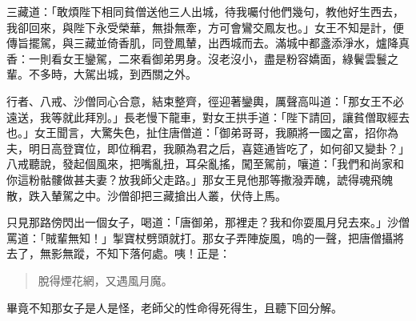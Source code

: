 三藏道：「敢煩陛下相同貧僧送他三人出城，待我囑付他們幾句，教他好生西去，我卻回來，與陛下永受榮華，無掛無牽，方可會鸞交鳳友也。」女王不知是計，便傳旨擺駕，與三藏並倚香肌，同登鳳輦，出西城而去。滿城中都盞添淨水，爐降真香：一則看女王鑾駕，二來看御弟男身。沒老沒小，盡是粉容嬌面，綠鬢雲鬟之輩。不多時，大駕出城，到西關之外。

行者、八戒、沙僧同心合意，結束整齊，徑迎著鑾輿，厲聲高叫道：「那女王不必遠送，我等就此拜別。」長老慢下龍車，對女王拱手道：「陛下請回，讓貧僧取經去也。」女王聞言，大驚失色，扯住唐僧道：「御弟哥哥，我願將一國之富，招你為夫，明日高登寶位，即位稱君，我願為君之后，喜筵通皆吃了，如何卻又變卦？」八戒聽說，發起個風來，把嘴亂扭，耳朵亂搖，闖至駕前，嚷道：「我們和尚家和你這粉骷髏做甚夫妻？放我師父走路。」那女王見他那等撒潑弄醜，諕得魂飛魄散，跌入輦駕之中。沙僧卻把三藏搶出人叢，伏侍上馬。

只見那路傍閃出一個女子，喝道：「唐御弟，那裡走？我和你耍風月兒去來。」沙僧罵道：「賊輩無知！」掣寶杖劈頭就打。那女子弄陣旋風，嗚的一聲，把唐僧攝將去了，無影無蹤，不知下落何處。咦！正是：
\begin{quote}
脫得煙花網，又遇風月魔。
\end{quote}

畢竟不知那女子是人是怪，老師父的性命得死得生，且聽下回分解。
